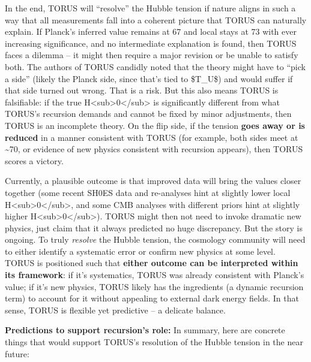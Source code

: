 \documentclass[]{article}
\begin{document}
In the end, TORUS will ``resolve'' the Hubble tension if nature aligns
in such a way that all measurements fall into a coherent picture that
TORUS can naturally explain. If Planck's inferred value remains at 67
and local stays at 73 with ever increasing significance, and no
intermediate explanation is found, then TORUS faces a dilemma -- it
might then require a major revision or be unable to satisfy both. The
authors of TORUS candidly noted that the theory might have to ``pick a
side'' (likely the Planck side, since that's tied to \$T\_U\$) and would
suffer if that side turned out wrong​. That is a risk. But this also
means TORUS is falsifiable: if the true
H\textless{}sub\textgreater{}0\textless{}/sub\textgreater{} is
significantly different from what TORUS's recursion demands and cannot
be fixed by minor adjustments, then TORUS is an incomplete theory. On
the flip side, if the tension \textbf{goes away or is reduced} in a
manner consistent with TORUS (for example, both sides meet at
\textasciitilde{}70, or evidence of new physics consistent with
recursion appears), then TORUS scores a victory​.

Currently, a plausible outcome is that improved data will bring the
values closer together (some recent SH0ES data and re-analyses hint at
slightly lower local
H\textless{}sub\textgreater{}0\textless{}/sub\textgreater{}, and some
CMB analyses with different priors hint at slightly higher
H\textless{}sub\textgreater{}0\textless{}/sub\textgreater{}). TORUS
might then not need to invoke dramatic new physics, just claim that it
always predicted no huge discrepancy. But the story is ongoing. To truly
\emph{resolve} the Hubble tension, the cosmology community will need to
either identify a systematic error or confirm new physics at some level.
TORUS is positioned such that \textbf{either outcome can be interpreted
within its framework}: if it's systematics, TORUS was already consistent
with Planck's value; if it's new physics, TORUS likely has the
ingredients (a dynamic recursion term) to account for it without
appealing to external dark energy fields. In that sense, TORUS is
flexible yet predictive -- a delicate balance.

\textbf{Predictions to support recursion's role:} In summary, here are
concrete things that would support TORUS's resolution of the Hubble
tension in the near future:
\end{document}
